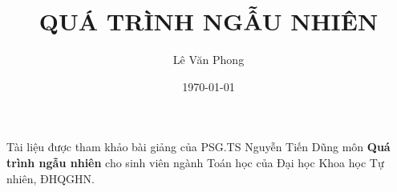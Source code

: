 \documentclass[11pt,vietnamese,BCOR8mm, most, usenames, dvipsnames, a4papers]{book}
\title{
    \textbf{QUÁ TRÌNH NGẪU NHIÊN}
}
\date{\today}
\author{Lê Văn Phong}
\begin{document}
Tài liệu được tham khảo bài giảng của PSG.TS Nguyễn Tiến Dũng môn \textbf{Quá trình ngẫu nhiên} cho sinh viên ngành Toán học của Đại học Khoa học Tự nhiên, ĐHQGHN.
\maketitle
\tableofcontents{}






\end{document}
